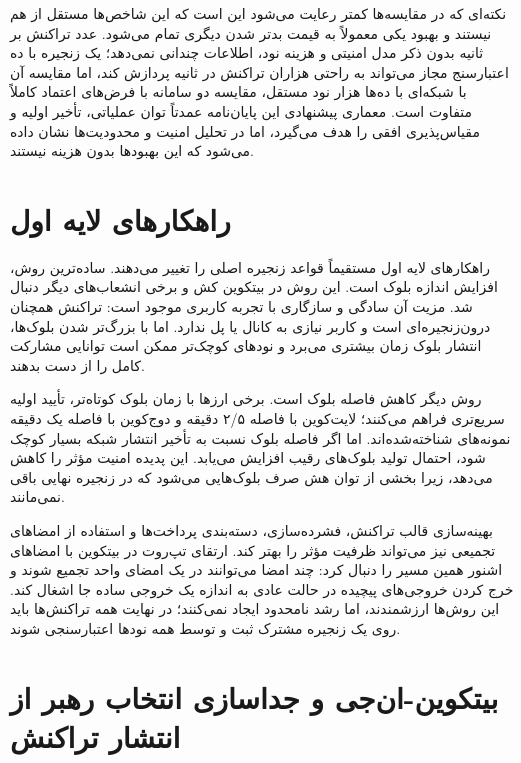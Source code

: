 نکته‌ای که در مقایسه‌ها کمتر رعایت می‌شود این است که این شاخص‌ها مستقل از هم نیستند و بهبود یکی معمولاً به قیمت بدتر شدن دیگری تمام می‌شود. عدد تراکنش بر ثانیه بدون ذکر مدل امنیتی و هزینه نود، اطلاعات چندانی نمی‌دهد؛ یک زنجیره با ده اعتبارسنج مجاز می‌تواند به راحتی هزاران تراکنش در ثانیه پردازش کند، اما مقایسه آن با شبکه‌ای با ده‌ها هزار نود مستقل، مقایسه دو سامانه با فرض‌های اعتماد کاملاً متفاوت است. معماری پیشنهادی این پایان‌نامه عمدتاً توان عملیاتی، تأخیر اولیه و مقیاس‌پذیری افقی را هدف می‌گیرد، اما در تحلیل امنیت و محدودیت‌ها نشان داده می‌شود که این بهبودها بدون هزینه نیستند.

\section{راهکارهای لایه اول}

راهکارهای لایه اول مستقیماً قواعد زنجیره اصلی را تغییر می‌دهند. ساده‌ترین روش، افزایش اندازه بلوک است. این روش در بیتکوین کش و برخی انشعاب‌های دیگر دنبال شد. مزیت آن سادگی و سازگاری با تجربه کاربری موجود است: تراکنش همچنان درون‌زنجیره‌ای است و کاربر نیازی به کانال یا پل ندارد. اما با بزرگ‌تر شدن بلوک‌ها، انتشار بلوک زمان بیشتری می‌برد و نودهای کوچک‌تر ممکن است توانایی مشارکت کامل را از دست بدهند.

روش دیگر کاهش فاصله بلوک است. برخی ارزها با زمان بلوک کوتاه‌تر، تأیید اولیه سریع‌تری فراهم می‌کنند؛ لایت‌کوین با فاصله ۲/۵ دقیقه و دوج‌کوین با فاصله یک دقیقه نمونه‌های شناخته‌شده‌اند. اما اگر فاصله بلوک نسبت به تأخیر انتشار شبکه بسیار کوچک شود، احتمال تولید بلوک‌های رقیب افزایش می‌یابد. این پدیده امنیت مؤثر را کاهش می‌دهد، زیرا بخشی از توان هش صرف بلوک‌هایی می‌شود که در زنجیره نهایی باقی نمی‌مانند.

بهینه‌سازی قالب تراکنش، فشرده‌سازی، دسته‌بندی پرداخت‌ها و استفاده از امضاهای تجمیعی نیز می‌تواند ظرفیت مؤثر را بهتر کند. ارتقای تپ‌روت در بیتکوین با امضاهای اشنور همین مسیر را دنبال کرد: چند امضا می‌توانند در یک امضای واحد تجمیع شوند و خرج کردن خروجی‌های پیچیده در حالت عادی به اندازه یک خروجی ساده جا اشغال کند. این روش‌ها ارزشمندند، اما رشد نامحدود ایجاد نمی‌کنند؛ در نهایت همه تراکنش‌ها باید روی یک زنجیره مشترک ثبت و توسط همه نودها اعتبارسنجی شوند.

\section{بیتکوین-ان‌جی و جداسازی انتخاب رهبر از انتشار تراکنش}

